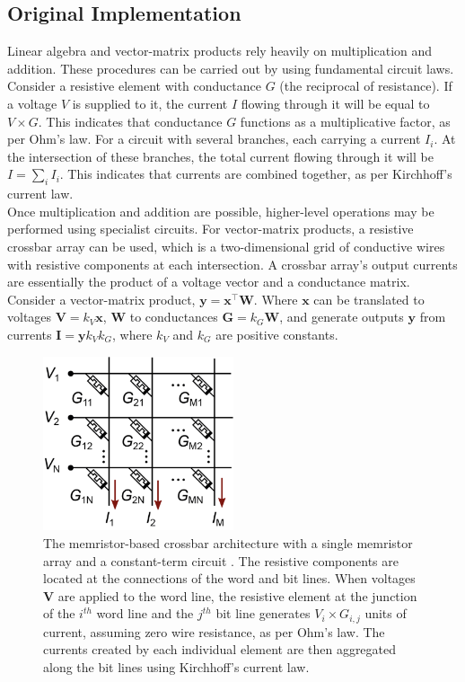 \subsection[Original Implementation]{Original Implementation}

Linear algebra and vector-matrix products rely heavily on multiplication and addition. These procedures can be carried out by using fundamental circuit laws. Consider a resistive element with conductance $G$ (the reciprocal of resistance). If a voltage $V$ is supplied to it, the current $I$ flowing through it will be equal to $V \times G$. This indicates that conductance $G$ functions as a multiplicative factor, as per Ohm's law. For a circuit with several branches, each carrying a current $I_i$. At the intersection of these branches, the total current flowing through it will be $I = \sum_{i}^{} I_i$. This indicates that currents are combined together, as per Kirchhoff's current law. \\

\noindent Once multiplication and addition are possible, higher-level operations may be performed using specialist circuits. For vector-matrix products, a resistive crossbar array can be used, which is a two-dimensional grid of conductive wires with resistive components at each intersection. A crossbar array's output currents are essentially the product of a voltage vector and a conductance matrix. Consider a vector-matrix product, $\mathbf{y} = \mathbf{x}^\intercal \mathbf{W}$. Where $\mathbf{x}$ can be translated to voltages $\mathbf{V} = k_V\mathbf{x}$, $\mathbf{W}$ to conductances $\mathbf{G} = k_G \mathbf{W}$, and generate outputs $\mathbf{y}$ from currents $\mathbf{I} = \mathbf{y} k_V k_G $, where $k_V$ and $k_G$ are positive constants. \\

\begin{figure}[htbp!] 
\centering    
\includegraphics[width=0.5\textwidth]{Chapter1/Figs/1k.png}
\caption[The memristor-based crossbar architecture.]{The memristor-based crossbar architecture with a single memristor array and a constant-term circuit \cite{truong2014new}. The resistive components are located at the connections of the word and bit lines. When voltages $\mathbf{V}$ are applied to the word line, the resistive element at the junction of the $i^{th}$ word line and the $j^{th}$ bit line generates $V_i \times G_{i,j}$ units of current, assuming zero wire resistance, as per Ohm's law. The currents created by each individual element are then aggregated along the bit lines using Kirchhoff's current law.}
\label{fig:1k}
\end{figure}

